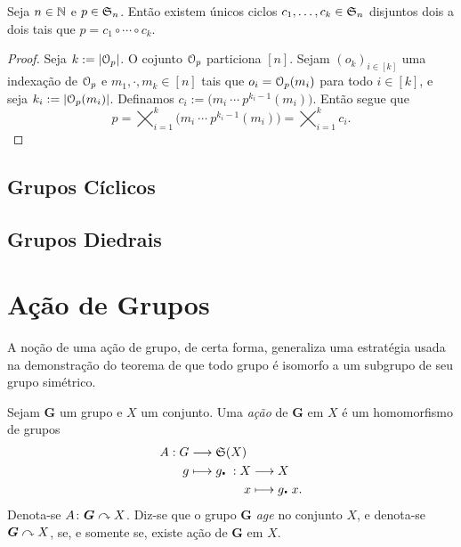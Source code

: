\begin{prop}
	Seja $n \in \mathbb{N}$ e $p \in \mathfrak{S}_n$. Então existem únicos ciclos $c_1,\ldots,c_k \in \mathfrak{S}_n$ disjuntos dois a dois tais que $p=c_1 \circ \cdots \circ c_k$.
\end{prop}
\begin{proof}
	Seja $k := \left\vert{\mathcal{O}_p}\right\vert$. O cojunto $\mathcal{O}_p$ particiona $[n]$. Sejam $(o_k)_{i \in [k]}$ uma indexação de $\mathcal{O}_p$ e $m_1,\cdot,m_k \in [n]$ tais que $o_i=\mathcal{O}_p(m_i)$ para todo $i \in [k]$, e seja $k_i := \left\vert{\mathcal{O}_p(m_i)}\right\vert$. Definamos $c_i :=  \bigl( m_i \ \cdots \  p^{k_i-1}(m_i)\bigr)$. Então segue que
	\begin{equation*}
	p = \bigtimes_{i=1}^k \bigl( m_i \ \cdots \  p^{k_i-1}(m_i)\bigr) = \bigtimes_{i=1}^k c_i.
	\end{equation*}
\end{proof}



\subsection{Grupos Cíclicos}

\subsection{Grupos Diedrais}


\cleardoublepage
\section{Ação de Grupos}

A noção de uma ação de grupo, de certa forma, generaliza uma estratégia usada na demonstração do teorema de que todo grupo é isomorfo a um subgrupo de seu grupo simétrico.

\begin{defi}
Sejam $\bm G$ um grupo e $X$ um conjunto. Uma \emph{ação} de $\bm G$ em $X$ é um homomorfismo de grupos
	\begin{align*}
	{A}: {G} &\longrightarrow {\mathfrak{S}(X)} \\{g} &\longmapsto {
		\begin{aligned}[t]
		 {g\mathord{\centerdot}\ }: {X} &\longrightarrow{X} \\{x} &\longmapsto{g\mathord{\centerdot}\ x.} 
		\end{aligned}
	}
	\end{align*}
Denota-se $A\colon \bm G \curvearrowright X$. Diz-se que o grupo $\bm G$ \emph{age} no conjunto $X$, e denota-se $\bm G \curvearrowright X$, se, e somente se, existe ação de $\bm G$ em $X$.
\end{defi}

